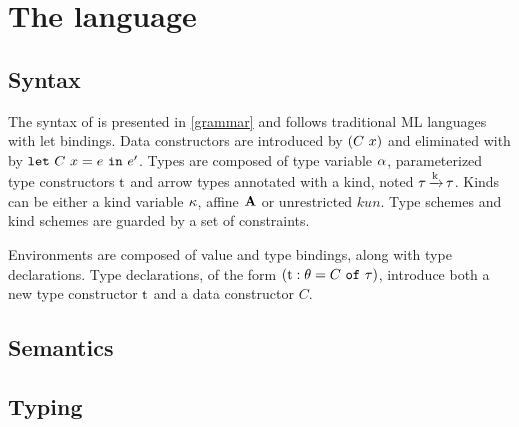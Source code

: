 \section{The \lang language}

\subsection{Syntax}

The syntax of \lang is presented in \cref{grammar} and follows
traditional ML languages with let bindings.
Data constructors are introduced by $(C\ x)$ and eliminated
with by $\mathtt{let}\ C\ x = e\ \mathtt{in}\ e'$.
Types are composed of type variable $\alpha$, parameterized type constructors
$\mathrm{t}$ and arrow types annotated with a kind, noted $\tau \operatorname{\xrightarrow{k}} \tau$.
Kinds can be either a kind variable $\kappa$, affine $\mathbf{A}$ or unrestricted $kun$.
Type schemes and kind schemes are guarded by a set of constraints.

Environments are composed of value and type bindings, along with type
declarations. Type declarations, of the form
$(\mathrm{t} : \theta = C\ \mathtt{of}\ \tau)$, introduce both a new type constructor $\mathrm{t}$ and
a data constructor $C$.

\begin{figure*}[h]
  \centering
  
  \caption{Syntax}
  \label{grammar}
\end{figure*}

\subsection{Semantics}

\TODO{}
%   


\subsection{Typing}


